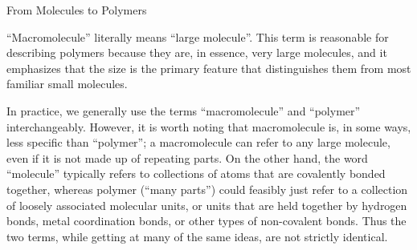 \begin{activity}{From Molecules to Polymers}
\begin{exercises}
		\begin{solution}
			``Macromolecule'' literally means ``large molecule''.  This term is reasonable for describing polymers because they are, in essence, very large molecules, and it emphasizes that the size is the primary feature that distinguishes them from most familiar small molecules.
			
			In practice, we generally use the terms ``macromolecule'' and ``polymer'' interchangeably.  However, it is worth noting that macromolecule is, in some ways, less specific than ``polymer''; a macromolecule can refer to any large molecule, even if it is not made up of repeating parts.  On the other hand, the word ``molecule'' typically refers to collections of atoms that are covalently bonded together, whereas polymer (``many parts'') could feasibly just refer to a collection of loosely associated molecular units, or units that are held together by hydrogen bonds, metal coordination bonds, or other types of non-covalent bonds.  Thus the two terms, while getting at many of the same ideas, are not strictly identical.
		\end{solution}
	
\end{exercises}



	


	
\end{activity}